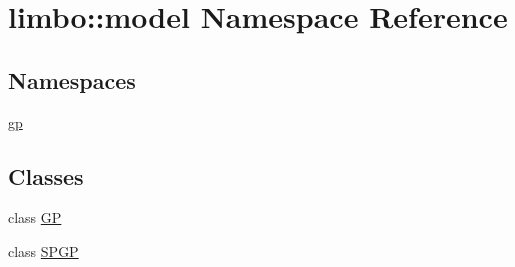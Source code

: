 \hypertarget{namespacelimbo_1_1model}{}\section{limbo\+:\+:model Namespace Reference}
\label{namespacelimbo_1_1model}
\subsection*{Namespaces}
\begin{DoxyCompactItemize}
\item 
 \hyperlink{namespacelimbo_1_1model_1_1gp}{gp}
\end{DoxyCompactItemize}
\subsection*{Classes}
\begin{DoxyCompactItemize}
\item 
class \hyperlink{classlimbo_1_1model_1_1_g_p}{G\+P}
\item 
class \hyperlink{classlimbo_1_1model_1_1_s_p_g_p}{S\+P\+G\+P}
\end{DoxyCompactItemize}
